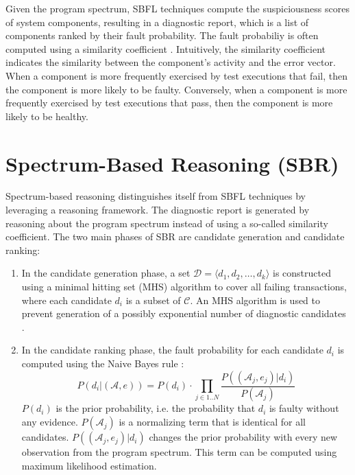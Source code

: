 \documentclass[twoside,a4paper,11pt]{memoir}
\begin{document}
Given the program spectrum, SBFL techniques compute the suspiciousness scores of system components, resulting in a diagnostic report, which is a list of components ranked by their fault probability.
The fault probabiliy is often computed using a similarity coefficient \cite{Jones_visualizationfor, 4041886, Naish:2011:MSS:2000791.2000795, 6651713, 5772029, ERICWONG2010188, 6058639}.
Intuitively, the similarity coefficient indicates the similarity between the component's activity and the error vector.
When a component is more frequently exercised by test executions that fail, then the component is more likely to be faulty.
Conversely, when a component is more frequently exercised by test executions that pass, then the component is more likely to be healthy.


\section{Spectrum-Based Reasoning (SBR)}
Spectrum-based reasoning distinguishes itself from SBFL techniques by leveraging a reasoning framework.
The diagnostic report is generated by reasoning about the program spectrum instead of using a so-called similarity coefficient.
The two main phases of SBR are candidate generation and candidate ranking:
\begin{enumerate}
  \item In the candidate generation phase, a set $\mathcal{D} = \langle d_1, d_2, \dots, d_k \rangle$ is constructed using a minimal hitting set (MHS) algorithm to cover all failing transactions, where each candidate $d_i$ is a subset of $\mathcal{C}$.
  An MHS algorithm is used to prevent generation of a possibly exponential number of diagnostic candidates \cite{Abreu:2009:SMF:1747491.1747511}.

  \item In the candidate ranking phase, the fault probability for each candidate $d_i$ is computed using the Naive Bayes rule \cite{Abreu:2009:SMF:1747491.1747511}:
  \begin{equation}
    P(d_i | (\mathcal{A}, e)) = P(d_i) \cdot \prod_{j \in 1..N} \frac{P((\mathcal{A}_j, e_j) | d_i)}{P(\mathcal{A}_j)}
  \end{equation}
  $P(d_i)$ is the prior probability, i.e. the probability that $d_i$ is faulty without any evidence.
  $P(\mathcal{A}_j)$ is a normalizing term that is identical for all candidates.
  $P((\mathcal{A}_j, e_j) | d_i)$ changes the prior probability with every new observation from the program spectrum.
  This term can be computed using maximum likelihood estimation.
\end{enumerate}
\end{document}
